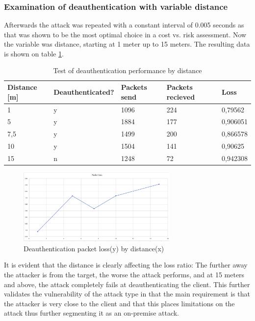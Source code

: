 \subsubsection{Examination of deauthentication with variable distance}
Afterwards the attack was repeated with a constant interval of 0.005 seconds as that was shown to be the most optimal choice in a cost vs. risk assessment. Now the variable was distance, starting at 1 meter up to 15 meters. The resulting data is shown on table \ref{Examination of deauthentication with variable distance}.

\begin{table}[!htbp]
\centering
\begin{tabular}{lllll}
\hline
Distance {[}m{]} & Deauthenticated? & Packets send & Packets recieved & Loss     \\ \hline
1                & y                & 1096         & 224              & 0,79562  \\
5                & y                & 1884         & 177              & 0,906051 \\
7,5              & y                & 1499         & 200              & 0,866578 \\
10               & y                & 1504         & 141              & 0,90625  \\
15               & n                & 1248         & 72               & 0,942308
\end{tabular}
\caption{Test of deauthentication performance by distance}
\label{Examination of deauthentication with variable distance}
\end{table}

\begin{figure}[!htbp]
    \centering
    \includegraphics[width=0.7\textwidth]{Latex-Files/Billeder/Tests/deauth_afstand.png}
    \caption{Deauthentication packet loss(y) by distance(x)}
    \label{Packet loss graph}
\end{figure}


It is evident that the distance is clearly affecting the loss ratio: The further away the attacker is from the target, the worse the attack performs, and at 15 meters and above, the attack completely fails at deauthenticating the client. This further validates the vulnerability of the attack type in that the main requirement is that the attacker is very close to the client and that this places limitations on the attack thus further segmenting it as an on-premise attack.

